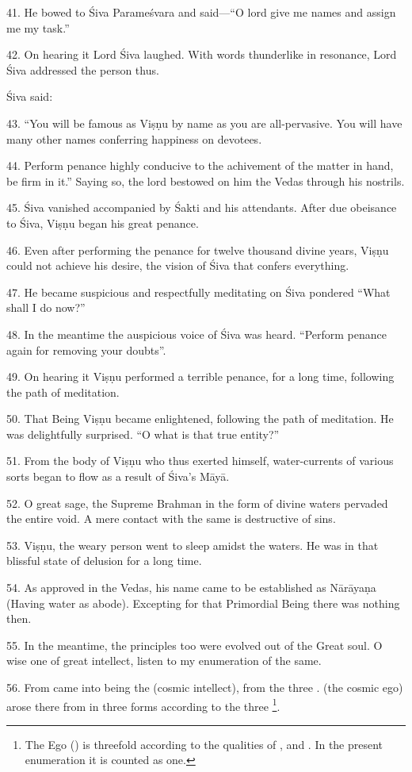 41. He bowed to Śiva Parameśvara and said—“O lord give me names and assign me my
task.”

42. On hearing it Lord Śiva laughed. With words thunderlike in resonance, Lord
Śiva addressed the person thus.

Śiva said:

43. “You will be famous as Viṣṇu by name as you are all-pervasive. You will have
many other names conferring happiness on devotees.

44. Perform penance highly conducive to the achivement of the matter in hand,
be firm in it.” Saying so, the lord bestowed on him the Vedas through his
nostrils.

45. Śiva vanished accompanied by Śakti and his attendants. After due obeisance
to Śiva, Viṣṇu began his great penance.

46. Even after performing the penance for twelve thousand divine years, Viṣṇu
could not achieve his desire, the vision of Śiva that confers everything.

47. He became suspicious and respectfully meditating on Śiva pondered “What
shall I do now?”

48. In the meantime the auspicious voice of Śiva was heard. “Perform penance
again for removing your doubts”.

49. On hearing it Viṣṇu performed a terrible penance, for a long time, following
the path of meditation.

50. That Being Viṣṇu became enlightened, following the path of meditation. He
was delightfully surprised. “O what is that true entity?”

51. From the body of Viṣṇu who thus exerted himself, water-currents of various
sorts began to flow as a result of Śiva’s Māyā.

52. O great sage, the Supreme Brahman in the form of divine waters pervaded
the entire void. A mere contact with the same is destructive of sins.

53. Viṣṇu, the weary person went to sleep amidst the waters. He was in that
blissful state of delusion for a long time.

54. As approved in the Vedas, his name came to be established as Nārāyaṇa
(Having water as abode). Excepting for that Primordial Being there was nothing
then.

55. In the meantime, the principles too were evolved out of the Great soul. O
wise one of great intellect, listen to my enumeration of the same.

56. From  came into being the  (cosmic intellect), from
 the three .  (the cosmic ego) arose there from
in three forms according to the three \footnote{The Ego ()
is threefold according to the qualities of ,  and
. In the present enumeration it is counted as one.}.

